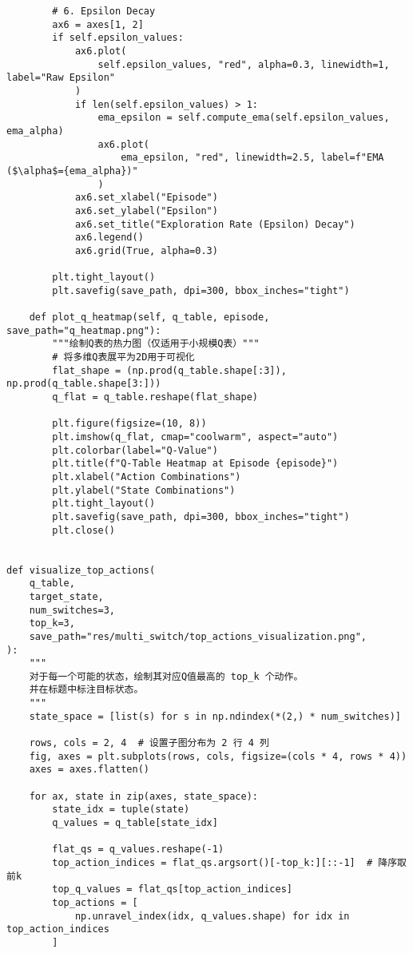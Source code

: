 \begin{verbatim}
        # 6. Epsilon Decay
        ax6 = axes[1, 2]
        if self.epsilon_values:
            ax6.plot(
                self.epsilon_values, "red", alpha=0.3, linewidth=1, label="Raw Epsilon"
            )
            if len(self.epsilon_values) > 1:
                ema_epsilon = self.compute_ema(self.epsilon_values, ema_alpha)
                ax6.plot(
                    ema_epsilon, "red", linewidth=2.5, label=f"EMA ($\alpha$={ema_alpha})"
                )
            ax6.set_xlabel("Episode")
            ax6.set_ylabel("Epsilon")
            ax6.set_title("Exploration Rate (Epsilon) Decay")
            ax6.legend()
            ax6.grid(True, alpha=0.3)

        plt.tight_layout()
        plt.savefig(save_path, dpi=300, bbox_inches="tight")

    def plot_q_heatmap(self, q_table, episode, save_path="q_heatmap.png"):
        """绘制Q表的热力图（仅适用于小规模Q表）"""
        # 将多维Q表展平为2D用于可视化
        flat_shape = (np.prod(q_table.shape[:3]), np.prod(q_table.shape[3:]))
        q_flat = q_table.reshape(flat_shape)

        plt.figure(figsize=(10, 8))
        plt.imshow(q_flat, cmap="coolwarm", aspect="auto")
        plt.colorbar(label="Q-Value")
        plt.title(f"Q-Table Heatmap at Episode {episode}")
        plt.xlabel("Action Combinations")
        plt.ylabel("State Combinations")
        plt.tight_layout()
        plt.savefig(save_path, dpi=300, bbox_inches="tight")
        plt.close()


def visualize_top_actions(
    q_table,
    target_state,
    num_switches=3,
    top_k=3,
    save_path="res/multi_switch/top_actions_visualization.png",
):
    """
    对于每一个可能的状态，绘制其对应Q值最高的 top_k 个动作。
    并在标题中标注目标状态。
    """
    state_space = [list(s) for s in np.ndindex(*(2,) * num_switches)]

    rows, cols = 2, 4  # 设置子图分布为 2 行 4 列
    fig, axes = plt.subplots(rows, cols, figsize=(cols * 4, rows * 4))
    axes = axes.flatten()

    for ax, state in zip(axes, state_space):
        state_idx = tuple(state)
        q_values = q_table[state_idx]

        flat_qs = q_values.reshape(-1)
        top_action_indices = flat_qs.argsort()[-top_k:][::-1]  # 降序取前k
        top_q_values = flat_qs[top_action_indices]
        top_actions = [
            np.unravel_index(idx, q_values.shape) for idx in top_action_indices
        ]


\end{verbatim}
